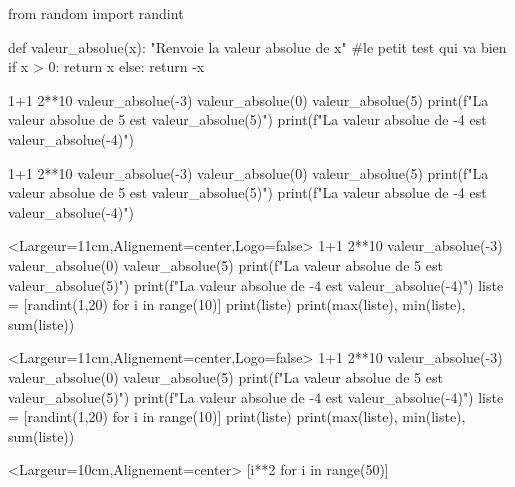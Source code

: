 \documentclass[french,a4paper,10pt]{article}
\begin{document}
\begin{python}
from random import randint

def valeur_absolue(x):
	"Renvoie la valeur absolue de x"
	#le petit test qui va bien
	if x > 0:
		return x
	else:
		return -x
\end{python}

{\small \begin{codehigh}
\begin{ConsolePiton}{}
1+1
2**10
valeur_absolue(-3)
valeur_absolue(0)
valeur_absolue(5)
print(f"La valeur absolue de 5 est {valeur_absolue(5)}")
print(f"La valeur absolue de -4 est {valeur_absolue(-4)}")
\end{ConsolePiton}
\end{codehigh}}

\begin{ConsolePiton}{}
1+1
2**10
valeur_absolue(-3)
valeur_absolue(0)
valeur_absolue(5)
print(f"La valeur absolue de 5 est {valeur_absolue(5)}")
print(f"La valeur absolue de -4 est {valeur_absolue(-4)}")
\end{ConsolePiton}

\pagebreak

{\small \begin{codehigh}
\begin{ConsolePiton}<Largeur=11cm,Alignement=center,Logo=false>{}
1+1
2**10
valeur_absolue(-3)
valeur_absolue(0)
valeur_absolue(5)
print(f"La valeur absolue de 5 est {valeur_absolue(5)}")
print(f"La valeur absolue de -4 est {valeur_absolue(-4)}")
liste = [randint(1,20) for i in range(10)]
print(liste)
print(max(liste), min(liste), sum(liste))
\end{ConsolePiton}
\end{codehigh}}

\begin{ConsolePiton}<Largeur=11cm,Alignement=center,Logo=false>{}
1+1
2**10
valeur_absolue(-3)
valeur_absolue(0)
valeur_absolue(5)
print(f"La valeur absolue de 5 est {valeur_absolue(5)}")
print(f"La valeur absolue de -4 est {valeur_absolue(-4)}")
liste = [randint(1,20) for i in range(10)]
print(liste)
print(max(liste), min(liste), sum(liste))
\end{ConsolePiton}

{\small \begin{codehigh}
\begin{ConsolePiton}<Largeur=10cm,Alignement=center>{}
[i**2 for i in range(50)]
\end{ConsolePiton}
\end{codehigh}}
\end{document}
